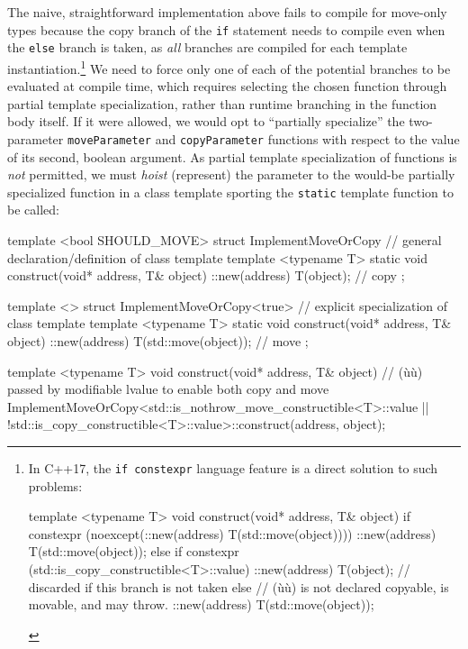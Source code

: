 \noindent The naive, straightforward implementation above fails to compile for
move-only types because the copy branch of the \lstinline!if! statement
needs to compile even when the \lstinline!else! branch is taken, as
\emph{all} branches are compiled for each template
instantiation.{\cprotect\footnote{In C++17, the
\lstinline!if!~\lstinline!constexpr! language feature is a direct solution
to such problems:

\begin{emcppslisting}[style=footcode,emcppsbatch=e19,emcppsstandards={c++17}]
template <typename T>
void construct(void* address, T& object)
{
    if constexpr (noexcept(::new(address) T(std::move(object))))
    {
        ::new(address) T(std::move(object));
    }
    else if constexpr (std::is_copy_constructible<T>::value)
    {
        ::new(address) T(object);  // discarded if this branch is not taken
    }
    else // (ù{}ù) is not declared copyable, is movable, and may throw.
    {
        ::new(address) T(std::move(object));
    }
}
\end{emcppslisting}
      }} We need to force only one of each of the potential branches to
be evaluated at compile time, which requires selecting the chosen
function through partial template specialization, rather than runtime
branching in the function body itself. If it were allowed, we would opt
to ``partially specialize'' the two-parameter \lstinline!moveParameter! and
\lstinline!copyParameter! functions with respect to the value of its
second, boolean argument. As partial template specialization of
functions is \emph{not} permitted, we must \emph{hoist} (represent) the
parameter to the would-be partially specialized function in a class
template sporting the \lstinline!static! template function to be called:

\begin{emcppslisting}[emcppsbatch=e20]
template <bool SHOULD_MOVE>
struct ImplementMoveOrCopy  // general declaration/definition of class template
{
    template <typename T>
    static void construct(void* address, T& object)
    {
        ::new(address) T(object); // copy
    }
};

template <>
struct ImplementMoveOrCopy<true>  // explicit specialization of class template
{
    template <typename T>
    static void construct(void* address, T& object)
    {
        ::new(address) T(std::move(object));   // move
    }
};

template <typename T>
void construct(void* address, T& object)
     // (ù{}ù) passed by modifiable lvalue to enable both copy and move
{
    ImplementMoveOrCopy<std::is_nothrow_move_constructible<T>::value ||
        !std::is_copy_constructible<T>::value>::construct(address, object);
}
\end{emcppslisting}
    

